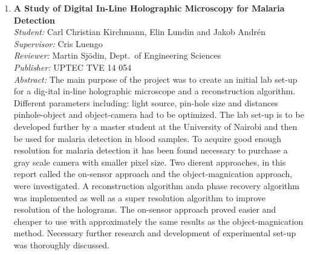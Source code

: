 \begin{small}
\begin{enumerate}
\item\textbf{A Study of Digital In-Line Holographic Microscopy for Malaria Detection}\\
  \emph{Student:}  Carl Christian Kirchmann, Elin Lundin and Jakob Andr\'{e}n \\
  \emph{Supervisor:} Cris Luengo\\
  \emph{Reviewer:} Martin Sj\"{o}din, Dept.~of Engineering Sciences\\
  \emph{Publisher:} UPTEC TVE 14 054\\
  \emph{Abstract:} The main purpose of the project was to create an initial lab set-up for a dig-ital in-line holographic microscope and a reconstruction algorithm. Different parameters including: light source, pin-hole size and distances pinhole-object and object-camera had to be optimized. The lab set-up is to be developed further by a master student at the University of Nairobi and then be used for malaria detection in blood samples. To acquire good enough resolution for malaria detection it has been found necessary to purchase a gray scale camera with smaller pixel size. Two dierent approaches, in this report called the on-sensor approach and the object-magnication approach, were investigated. A reconstruction algorithm anda phase recovery algorithm was implemented as well as a super resolution algorithm to improve resolution of the holograms. The on-sensor approach proved easier and cheaper to use with approximately the same results as the object-magnication method. Necessary further research and development of experimental set-up was thoroughly discussed.


\end{enumerate}
\end{small}

